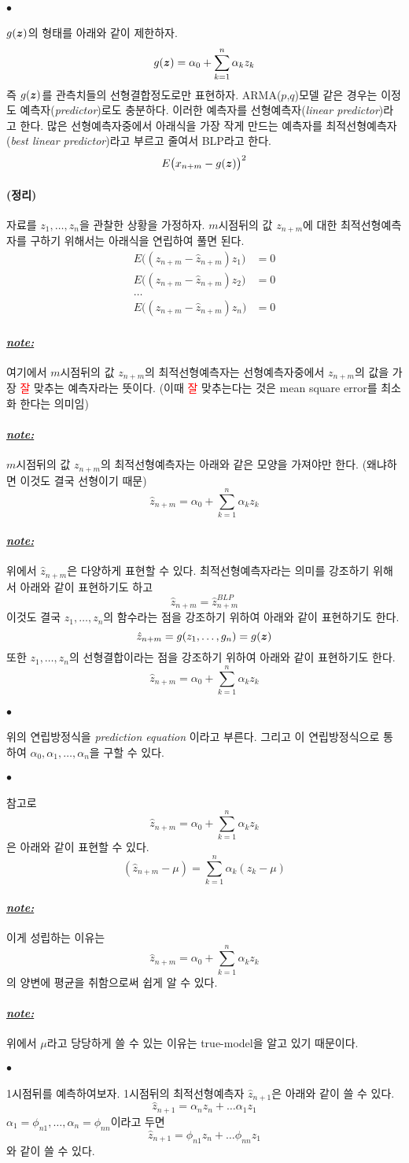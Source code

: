 \documentclass[12pt,oneside,english]{book}
\def\ck{\paragraph{\Large$\bullet$}\Large}
\def\thm{\paragraph{\Large(정리)}\Large}
\def\note{\paragraph{\Large\textit{\underline{note:}}}\Large}
\newcommand{\vz}{\mbox{\boldmath $z$}}
\begin{document}
\ck $g(\vz)$의 형태를 아래와 같이 제한하자. 
\[
g(\vz)=\alpha_0+\sum_{k=1}^{n}\alpha_kz_k
\]
즉 $g(\vz)$를 관측치들의 선형결합정도로만 표현하자. ARMA($p$,$q$)모델 같은 경우는 이정도 예측자(\emph{predictor})로도 충분하다. 이러한 예측자를 선형예측자(\emph{linear predictor})라고 한다. 많은 선형예측자중에서 아래식을 가장 작게 만드는  예측자를 최적선형예측자(\emph{best linear predictor})라고 부르고 줄여서 BLP라고 한다. 
\[
E\big(x_{n+m}-g(\vz)\big)^2
\]

\thm 자료를 $z_1,\dots,z_n$을 관찰한 상황을 가정하자. $m$시점뒤의 값 $z_{n+m}$에 대한 최적선형예측자를 구하기 위해서는 아래식을 연립하여 풀면 된다. 
\begin{align*}
E\big((z_{n+m}-\hat{z}_{n+m})z_1\big)&=0 \\
E\big((z_{n+m}-\hat{z}_{n+m})z_2\big)&=0 \\
\dots& \\ 
E\big((z_{n+m}-\hat{z}_{n+m})z_n\big)&=0 
\end{align*}

\note 여기에서 $m$시점뒤의 값 $z_{n+m}$의 최적선형예측자는 선형예측자중에서 $z_{n+m}$의 값을 가장 \textcolor{red}{잘} 맞추는 예측자라는 뜻이다. (이때 \textcolor{red}{잘} 맞추는다는 것은 mean square error를 최소화 한다는 의미임) 

\note $m$시점뒤의 값 $z_{n+m}$의 최적선형예측자는 아래와 같은 모양을 가져야만 한다. (왜냐하면 이것도 결국 선형이기 때문)
\[
\hat{z}_{n+m}=\alpha_0+\sum_{k=1}^{n}\alpha_kz_k
\]

\note 위에서 $\hat{z}_{n+m}$은 다양하게 표현할 수 있다. 최적선형예측자라는 의미를 강조하기 위해서 아래와 같이 표현하기도 하고
\[
\hat{z}_{n+m}=\hat{z}_{n+m}^{BLP}
\]
이것도 결국 $z_1,\dots,z_n$의 함수라는 점을 강조하기 위하여 아래와 같이 표현하기도 한다. 
\[
\hat{z}_{n+m}=g(z_1,\dots,g_n)=g(\vz)
\]
또한 $z_1,\dots,z_n$의 선형결합이라는 점을 강조하기 위하여 아래와 같이 표현하기도 한다. 
\[
\hat{z}_{n+m}=\alpha_0+\sum_{k=1}^{n}\alpha_kz_k
\]

\ck 위의 연립방정식을 \emph{prediction equation} 이라고 부른다. 그리고 이 연립방정식으로 통하여 $\alpha_0,\alpha_1,\dots,\alpha_n$을 구할 수 있다. 

\ck 참고로 
\[
\hat{z}_{n+m}=\alpha_0+\sum_{k=1}^{n}\alpha_kz_k
\]
은 아래와 같이 표현할 수 있다. 
\[
(\hat{z}_{n+m}-\mu)=\sum_{k=1}^{n}\alpha_k(z_k-\mu)
\]

\note 이게 성립하는 이유는 
\[
\hat{z}_{n+m}=\alpha_0+\sum_{k=1}^{n}\alpha_kz_k
\]
의 양변에 평균을 취함으로써 쉽게 알 수 있다. 

\note 위에서 $\mu$라고 당당하게 쓸 수 있는 이유는 true-model을 알고 있기 때문이다. 

\ck 1시점뒤를 예측하여보자. 1시점뒤의 최적선형예측자 $\hat{z}_{n+1}$은 아래와 같이 쓸 수 있다. 
\[
\hat{z}_{n+1}=\alpha_{n}z_n+\dots\alpha_{1}z_1
\]
$\alpha_1=\phi_{n1},\dots,\alpha_{n}=\phi_{nn}$이라고 두면 
\[
\hat{z}_{n+1}=\phi_{n1}z_n+\dots\phi_{nn}z_1
\]
와 같이 쓸 수 있다. 
\end{document}

